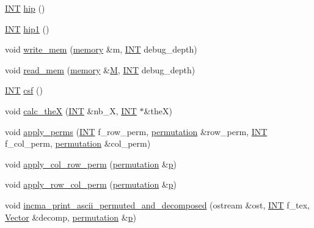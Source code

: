 \begin{DoxyCompactItemize}
\item 
\mbox{\hyperlink{galois_8h_a09fddde158a3a20bd2dcadb609de11dc}{I\+NT}} \mbox{\hyperlink{classmatrix_a820b8de607274302772f753e7585e9fa}{hip}} ()
\item 
\mbox{\hyperlink{galois_8h_a09fddde158a3a20bd2dcadb609de11dc}{I\+NT}} \mbox{\hyperlink{classmatrix_a169cd51dd98562746f81dd0b075f3f6f}{hip1}} ()
\item 
void \mbox{\hyperlink{classmatrix_a773aa4ab691548beba8e6204d9f4ef21}{write\+\_\+mem}} (\mbox{\hyperlink{classmemory}{memory}} \&m, \mbox{\hyperlink{galois_8h_a09fddde158a3a20bd2dcadb609de11dc}{I\+NT}} debug\+\_\+depth)
\item 
void \mbox{\hyperlink{classmatrix_a11e3236059f10ed69c47c65c79e7f03b}{read\+\_\+mem}} (\mbox{\hyperlink{classmemory}{memory}} \&\mbox{\hyperlink{plane__search_8_c_ad2d23ebd03187a91edd45b1d5e496265}{M}}, \mbox{\hyperlink{galois_8h_a09fddde158a3a20bd2dcadb609de11dc}{I\+NT}} debug\+\_\+depth)
\item 
\mbox{\hyperlink{galois_8h_a09fddde158a3a20bd2dcadb609de11dc}{I\+NT}} \mbox{\hyperlink{classmatrix_af06fd7824274febfcc10f734a06d1a6e}{csf}} ()
\item 
void \mbox{\hyperlink{classmatrix_abf772e9b3338df569be017ffecb165ef}{calc\+\_\+theX}} (\mbox{\hyperlink{galois_8h_a09fddde158a3a20bd2dcadb609de11dc}{I\+NT}} \&nb\+\_\+X, \mbox{\hyperlink{galois_8h_a09fddde158a3a20bd2dcadb609de11dc}{I\+NT}} $\ast$\&theX)
\item 
void \mbox{\hyperlink{classmatrix_a4bfbaa097eedb8b427169c593cbb40d0}{apply\+\_\+perms}} (\mbox{\hyperlink{galois_8h_a09fddde158a3a20bd2dcadb609de11dc}{I\+NT}} f\+\_\+row\+\_\+perm, \mbox{\hyperlink{classpermutation}{permutation}} \&row\+\_\+perm, \mbox{\hyperlink{galois_8h_a09fddde158a3a20bd2dcadb609de11dc}{I\+NT}} f\+\_\+col\+\_\+perm, \mbox{\hyperlink{classpermutation}{permutation}} \&col\+\_\+perm)
\item 
void \mbox{\hyperlink{classmatrix_a260e37c93f9e2d55d02ecddcb483659a}{apply\+\_\+col\+\_\+row\+\_\+perm}} (\mbox{\hyperlink{classpermutation}{permutation}} \&\mbox{\hyperlink{alphabet2_8_c_a533391314665d6bf1b5575e9a9cd8552}{p}})
\item 
void \mbox{\hyperlink{classmatrix_ad413b1eccc8402fb7281d70dc06915f5}{apply\+\_\+row\+\_\+col\+\_\+perm}} (\mbox{\hyperlink{classpermutation}{permutation}} \&\mbox{\hyperlink{alphabet2_8_c_a533391314665d6bf1b5575e9a9cd8552}{p}})
\item 
void \mbox{\hyperlink{classmatrix_a0ced6791191355bde858790aa4b156ac}{incma\+\_\+print\+\_\+ascii\+\_\+permuted\+\_\+and\+\_\+decomposed}} (ostream \&ost, \mbox{\hyperlink{galois_8h_a09fddde158a3a20bd2dcadb609de11dc}{I\+NT}} f\+\_\+tex, \mbox{\hyperlink{class_vector}{Vector}} \&decomp, \mbox{\hyperlink{classpermutation}{permutation}} \&\mbox{\hyperlink{alphabet2_8_c_a533391314665d6bf1b5575e9a9cd8552}{p}})

\end{DoxyCompactItemize}
